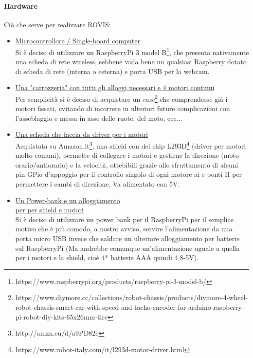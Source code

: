 \documentclass[11pt]{article}
\begin{document}
\paragraph{Hardware}
Ciò che serve per realizzare ROVIS:
\begin{itemize}
\item \underline{Microcontrollore / Single-board computer}\\
Si è deciso di utilizzare un RaspberryPi 3 model B\footnote{https://www.raspberrypi.org/products/raspberry-pi-3-model-b/}, che presenta nativamente una scheda di rete wireless, sebbene vada bene un qualsiasi Raspberry dotato di scheda di rete (interna o esterna) e porta USB per la webcam.
\item \underline{Una "carrozzeria" con tutti gli alloggi necessari e 4 motori continui}\\
Per semplicità si è deciso di acquistare un \textit{case}\footnote{https://www.diymore.cc/collections/robot-chassis/products/diymore-4-wheel-robot-chassis-smart-car-with-speed-and-tacho-encoder-for-arduino-raspberry-pi-robot-diy-kits-65x26mm-tire} che comprendesse già i motori fissati, evitando di incorrere in ulteriori future complicazioni con l'asseblaggio e messa in asse delle ruote, del moto, ecc...\\
\item \underline{Una scheda che faccia da driver per i motori}\\
Acquistata su Amazon.it\footnote{http://amzn.eu/d/a9PD82e}, una shield con dei chip L293D\footnote{https://www.robot-italy.com/it/l293d-motor-driver.html} (driver per motori molto comuni), permette di collegare i motori e gestirne la direzione (moto orario/antiorario)  e la velocità, ottebibili grazie allo sfruttamento di alcuni pin GPio d'appoggio per il controllo singolo di ogni motore ai e ponti H per permettere i cambi di direzione. Va alimentato con 5V.
\item \underline{Un Power-bank e un alloggiamento\\ per per shield e motori} \\
Si è deciso di utilizzare un power bank per il RaspberryPi per il semplice motivo che è più comodo, a nostro avviso, servire l'alimentazione da una porta micro USB invece che saldare un ulteriore alloggiamento per batterie sul RaspberryPi (Ma andrebbe comunque un'alimentazione uguale a quella per i motori e la shield, cioè 4* batterie AAA quindi 4.8-5V).

\end{itemize}
\end{document}
